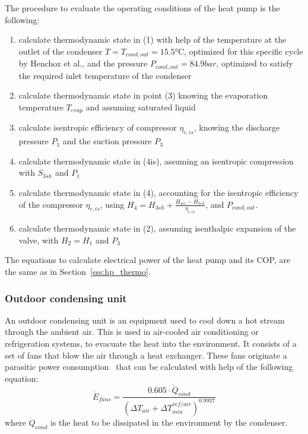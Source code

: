 \documentclass{article}
\begin{document}
The procedure to evaluate the operating conditions of the heat pump is the following:
\begin{enumerate}
	\item calculate thermodynamic state in (1) with help of the temperature at the outlet of the condenser $T = T_{cond,out} = 15.5 \si{\celsius}$, optimized for this specific cycle by Henchoz et al.\cite{henchozPerformanceProfitabilityPerspectives2015}, and the pressure $P_{cond,out} = 84.9 bar$, optimized to satisfy the required inlet temperature of the condenser
	\item calculate thermodynamic state in point (3) knowing the evaporation temperature $T_{evap}$ and assuming saturated liquid
	\item calculate isentropic efficiency of compressor $\eta_{c,is}$, knowing the discharge pressure $P_{1}$ and the suction pressure $P_{3}$
	\item calculate thermodynamic state in (4is), assuming an isentropic compression with $S_{3sh}$ and $P_{1}$
	\item calculate thermodynamic state in (4), accounting for the isentropic efficiency of the compressor $\eta_{c,is}$, using $H_{4} = H_{3sh} + \frac{H_{4is} - H_{3sh}}{\eta_{c,is}}$, and $P_{cond,out}$.
	\item calculate thermodynamic state in (2), assuming isenthalpic expansion of the valve, with $H_{2} = H_{1}$ and $P_{3}$
\end{enumerate}

The equations to calculate electrical power of the heat pump and its COP, are the same as in Section~\ref{sss:hp_thermo}.

\subsubsection{Outdoor condensing unit}\label{sss:cooling_tower}
An outdoor condensing unit is an equipment used to cool down a hot stream through the ambient air. This is used in air-cooled air conditioning or refrigeration systems, to evacuate the heat into the environment. It consists of a set of fans that blow the air through a heat exchanger. These fans originate a parasitic power consumption~\cite{henchozPotentialRefrigerantBased2016} that can be calculated with help of the following equation:
\begin{equation}
\dot{E}_{fans} = \frac{0.605 \cdot \dot{Q}_{cond}}{( \Delta T_{air} + \Delta T_{min}^{ref/air})^{0.9937}}
\end{equation}
where $\dot{Q}_{cond}$ is the heat to be dissipated in the environment by the condenser. 
\end{document}
